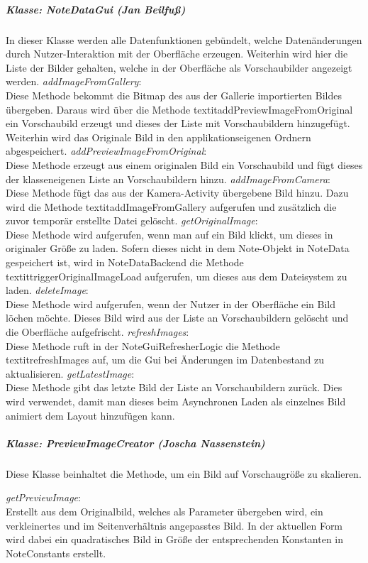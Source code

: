 \subparagraph*{Klasse: NoteDataGui (Jan Beilfuß)}
In dieser Klasse werden alle Datenfunktionen gebündelt, welche Datenänderungen durch Nutzer-Interaktion mit der Oberfläche erzeugen. Weiterhin wird hier die Liste der Bilder gehalten, welche in der Oberfläche als Vorschaubilder angezeigt werden.
\textit{addImageFromGallery}:\\
Diese Methode bekommt die Bitmap des aus der Gallerie importierten Bildes übergeben. Daraus wird über die Methode textit{addPreviewImageFromOriginal} ein Vorschaubild erzeugt und dieses der Liste mit Vorschaubildern hinzugefügt. Weiterhin wird das Originale Bild in den applikationseigenen Ordnern abgespeichert.
\textit{addPreviewImageFromOriginal}:\\
Diese Methode erzeugt aus einem originalen Bild ein Vorschaubild und fügt dieses der klasseneigenen Liste an Vorschaubildern hinzu.
\textit{addImageFromCamera}:\\
Diese Methode fügt das aus der Kamera-Activity übergebene Bild hinzu. Dazu wird die Methode textit{addImageFromGallery} aufgerufen und zusätzlich die zuvor temporär erstellte Datei gelöscht.
\textit{getOriginalImage}:\\
Diese Methode wird aufgerufen, wenn man auf ein Bild klickt, um dieses in originaler Größe zu laden. Sofern dieses nicht in dem Note-Objekt in NoteData gespeichert ist, wird in NoteDataBackend die Methode textit{triggerOriginalImageLoad} aufgerufen, um dieses aus dem Dateisystem zu laden.
\textit{deleteImage}:\\
Diese Methode wird aufgerufen, wenn der Nutzer in der Oberfläche ein Bild löchen möchte. Dieses Bild wird aus der Liste an Vorschaubildern gelöscht und die Oberfläche aufgefrischt.
\textit{refreshImages}:\\
Diese Methode ruft in der NoteGuiRefresherLogic die Methode textit{refreshImages} auf, um die Gui bei Änderungen im Datenbestand zu aktualisieren.
\textit{getLatestImage}:\\
Diese Methode gibt das letzte Bild der Liste an Vorschaubildern zurück. Dies wird verwendet, damit man dieses beim Asynchronen Laden als einzelnes Bild animiert dem Layout hinzufügen kann.

\subparagraph*{Klasse: PreviewImageCreator (Joscha Nassenstein)}
Diese Klasse beinhaltet die Methode, um ein Bild auf Vorschaugröße zu skalieren.

\textit{getPreviewImage}:\\
Erstellt aus dem Originalbild, welches als Parameter übergeben wird, ein verkleinertes und im Seitenverhältnis angepasstes Bild. In der aktuellen Form wird dabei ein quadratisches Bild in Größe der entsprechenden Konstanten in NoteConstants erstellt.

